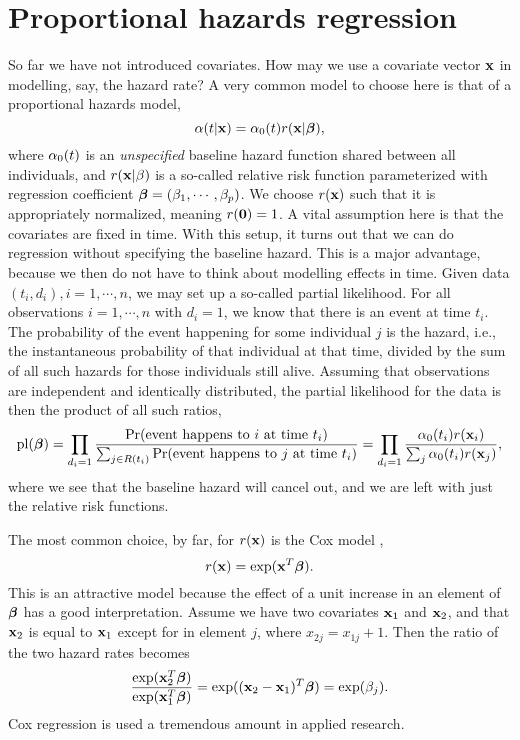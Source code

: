 \section{Proportional hazards regression}
So far we have not introduced covariates. How may we use a covariate vector $\mathbf{x}$ in modelling, say, the hazard rate? A very common model to choose here is that of a proportional hazards model,
\begin{equation}\label{PH}
    \alpha(t|\mathbf{x})=\alpha_0(t)r(\mathbf{x}|\boldsymbol{\beta}),
\end{equation}
where $\alpha_0(t)$ is an \textit{unspecified} baseline hazard function shared between all individuals, and $r(\mathbf{x}|\beta)$ is a so-called relative risk function parameterized with regression coefficient $\boldsymbol{\beta}=(\beta_1,\cdots,\beta_p)$. We choose $r(\mathbf{x})$ such that it is appropriately normalized, meaning $r(\mathbf{0})=1$. A vital assumption here is that the covariates are fixed in time. With this setup, it turns out that we can do regression without specifying the baseline hazard. This is a major advantage, because we then do not have to think about modelling effects in time. Given data $(t_i,d_i),i=1,\cdots,n$, we may set up a so-called partial likelihood.  For all observations $i=1,\cdots,n$ with $d_i=1$, we know that there is an event at time $t_i$. The probability of the event happening for some individual $j$ is the hazard, i.e., the instantaneous probability of that individual at that time, divided by the sum of all such hazards for those individuals still alive. Assuming that observations are independent and identically distributed, the partial likelihood for the data is then the product of all such ratios,
\begin{equation*}
    \operatorname{pl}(\boldsymbol{\beta})=\prod_{d_i=1}\frac{\Pr(\text{event happens to }i\text{ at time }t_i)}{\sum_{j\in R(t_i)}\Pr(\text{event happens to }j\text{ at time }t_i)}=\prod_{d_i=1}\frac{\alpha_0(t_i)r(\mathbf{x}_i)}{\sum_j \alpha_0(t_i)r(\mathbf{x}_j)},
\end{equation*}
where we see that the baseline hazard will cancel out, and we are left with just the relative risk functions.

The most common choice, by far, for $r(\mathbf{x})$ is the Cox model \citep{cox},
\begin{equation*}
    r(\mathbf{x})=\exp(\mathbf{x}^T\boldsymbol{\beta}).
\end{equation*}
This is an attractive model because the effect of a unit increase in an element of $\boldsymbol{\beta}$ has a good interpretation. Assume we have two covariates $\mathbf{x}_1$ and $\mathbf{x}_2$, and that $\mathbf{x}_2$ is equal to $\mathbf{x}_1$ except for in element $j$, where $x_{2j}=x_{1j}+1$. Then the ratio of the two hazard rates becomes
\begin{equation*}
    \frac{\exp(\mathbf{x}_2^T\boldsymbol{\beta})}{\exp(\mathbf{x}_1^T\boldsymbol{\beta})}=\exp((\mathbf{x}_2-\mathbf{x}_1)^T\boldsymbol{\beta})=\exp(\beta_j).
\end{equation*}
Cox regression is used a tremendous amount in applied research.

